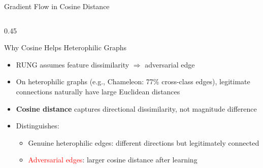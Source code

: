 \documentclass[aspectratio=169]{beamer}
\begin{document}
\begin{frame}{Gradient Flow in Cosine Distance}
\begin{columns}[T]
\begin{column}{0.45\textwidth}
\begin{block}{Why Cosine Helps Heterophilic Graphs}
\begin{itemize}
          \item RUNG assumes feature dissimilarity $\Rightarrow$ adversarial edge
          \item On heterophilic graphs (e.g., Chameleon: 77\% cross-class edges), legitimate connections naturally have large Euclidean distances
          \item \textbf{Cosine distance} captures directional dissimilarity, not magnitude difference
          \item Distinguishes:
          \begin{itemize}
            \item \textcolor{runggreen}{Genuine heterophilic edges}: different directions but legitimately connected
            \item \textcolor{red}{Adversarial edges}: larger cosine distance after learning
          \end{itemize}
        \end{itemize}
      \end{block}
    \end{column}
  \end{columns}
\end{frame}
\end{document}
